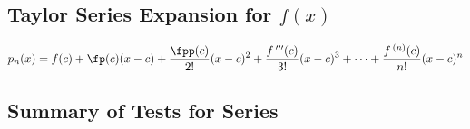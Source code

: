 \bigskip

\subsection*{Taylor Series Expansion for $f(x)$}
\noindent$\ds p_n(x) = f(c) + \fp(c)(x-c) + \frac{\fpp(c)}{2!}(x-c)^2 + \frac{f\,'''(c)}{3!}(x-c)^3 + \dotsb + \frac{f\,^{(n)}(c)}{n!}(x-c)^n$
\bigskip


\clearpage

\subsection*{Summary of Tests for Series}

